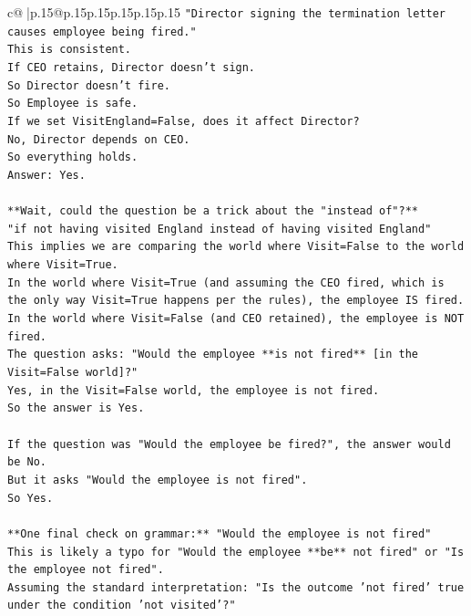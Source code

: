 \documentclass{article}
\begin{document}
{\begin{supertabular}{c@{$\;$}|p{.15\linewidth}@{}p{.15\linewidth}p{.15\linewidth}p{.15\linewidth}p{.15\linewidth}p{.15\linewidth}}
{{{\texttt{"Director signing the termination letter causes employee being fired."} \\
\texttt{This is consistent.} \\
\texttt{If CEO retains, Director doesn't sign.} \\
\texttt{So Director doesn't fire.} \\
\texttt{So Employee is safe.} \\
\texttt{If we set VisitEngland=False, does it affect Director?} \\
\texttt{No, Director depends on CEO.} \\
\texttt{So everything holds.} \\
\texttt{Answer: Yes.} \\
\\ 
\texttt{**Wait, could the question be a trick about the "instead of"?**} \\
\texttt{"if not having visited England instead of having visited England"} \\
\texttt{This implies we are comparing the world where Visit=False to the world where Visit=True.} \\
\texttt{In the world where Visit=True (and assuming the CEO fired, which is the only way Visit=True happens per the rules), the employee IS fired.} \\
\texttt{In the world where Visit=False (and CEO retained), the employee is NOT fired.} \\
\texttt{The question asks: "Would the employee **is not fired** {[}in the Visit=False world{]}?"} \\
\texttt{Yes, in the Visit=False world, the employee is not fired.} \\
\texttt{So the answer is Yes.} \\
\\ 
\texttt{If the question was "Would the employee be fired?", the answer would be No.} \\
\texttt{But it asks "Would the employee is not fired".} \\
\texttt{So Yes.} \\
\\ 
\texttt{**One final check on grammar:** "Would the employee is not fired"} \\
\texttt{This is likely a typo for "Would the employee **be** not fired" or "Is the employee not fired".} \\
\texttt{Assuming the standard interpretation: "Is the outcome 'not fired' true under the condition 'not visited'?"} \\
}}}
\end{supertabular}}
\end{document}
